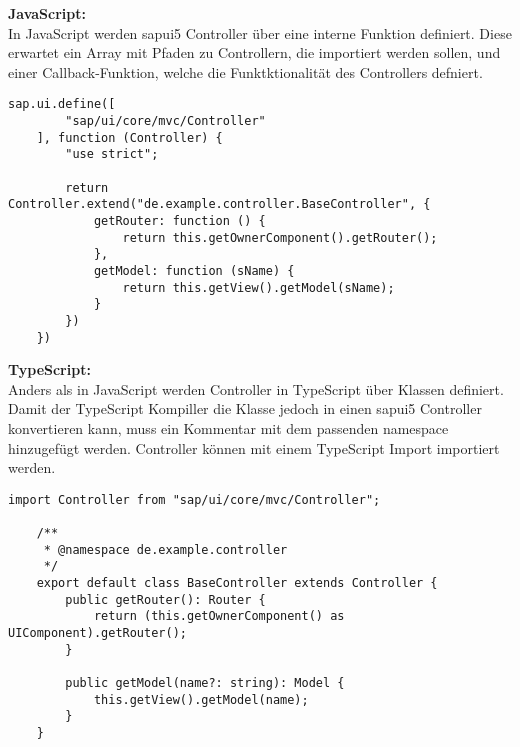 \textbf{JavaScript:} \\
In JavaScript werden \gls{sapui5} Controller über eine interne Funktion definiert. 
Diese erwartet ein Array mit Pfaden zu Controllern, die importiert werden sollen, und einer Callback-Funktion, welche die Funktktionalität des Controllers defniert.
\begin{lstlisting}[caption={Beispiel: JavaScript BaseController.js}]
    sap.ui.define([
        "sap/ui/core/mvc/Controller"
    ], function (Controller) {
        "use strict";

        return Controller.extend("de.example.controller.BaseController", {
            getRouter: function () {
                return this.getOwnerComponent().getRouter();
            },
            getModel: function (sName) {
                return this.getView().getModel(sName);
            }
        })
    })
\end{lstlisting}

\textbf{TypeScript:} \\
Anders als in JavaScript werden Controller in TypeScript über Klassen definiert. 
Damit der TypeScript Kompiller die Klasse jedoch in einen \gls{sapui5} Controller konvertieren kann, muss ein Kommentar mit dem passenden namespace hinzugefügt werden.
Controller können mit einem TypeScript Import importiert werden.
\begin{lstlisting}[caption={Beispiel: TypeScript BaseController.ts}, ]
    import Controller from "sap/ui/core/mvc/Controller";

    /**
     * @namespace de.example.controller
     */
    export default class BaseController extends Controller {
        public getRouter(): Router {
            return (this.getOwnerComponent() as UIComponent).getRouter();
        }

        public getModel(name?: string): Model {
            this.getView().getModel(name);
        }
    }
\end{lstlisting}
